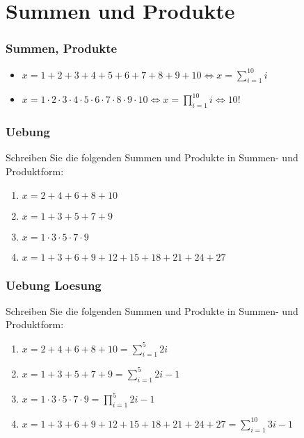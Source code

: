 \section{Summen und Produkte}
\begin{frame}
    \frametitle{Summen, Produkte}
    \begin{itemize}
        \vfill \item $x = 1+2+3+4+5+6+7+8+9+10 \iff x = \sum_{i=1}^{10} i$
        \vfill \item $x = 1 \cdot 2 \cdot 3 \cdot 4 \cdot 5 \cdot 6 \cdot 7 \cdot 8 \cdot 9 \cdot 10 \iff x = \prod_{i=1}^{10} i \iff 10!$
    \end{itemize}
\end{frame}

\begin{frame}
    \frametitle{Uebung}
    Schreiben Sie die folgenden Summen und Produkte in Summen- und Produktform:
    \begin{enumerate}
        \vfill \item $x = 2+4+6+8+10$
        \vfill \item $x = 1+3+5+7+9$
        \vfill \item $x = 1 \cdot 3 \cdot 5 \cdot 7 \cdot 9$
        \vfill \item $x = 1+3+6+9+12+15+18+21+24+27$
    \end{enumerate}
\end{frame}

\begin{frame}
    \frametitle{Uebung Loesung}
    Schreiben Sie die folgenden Summen und Produkte in Summen- und Produktform:
    \begin{enumerate}
        \vfill \item $x = 2+4+6+8+10 = \sum_{i=1}^{5} 2i$
        \vfill \item $x = 1+3+5+7+9 = \sum_{i=1}^{5} 2i-1$
        \vfill \item $x = 1 \cdot 3 \cdot 5 \cdot 7 \cdot 9 = \prod_{i=1}^{5} 2i-1$
        \vfill \item $x = 1+3+6+9+12+15+18+21+24+27 = \sum_{i=1}^{10} 3i-1$
    \end{enumerate}
\end{frame}
